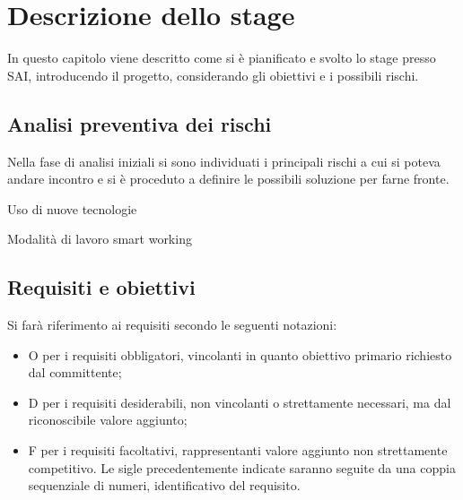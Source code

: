 
\chapter{Descrizione dello stage}
\label{cap:descrizione-stage}

In questo capitolo viene descritto come si è pianificato e svolto lo stage presso SAI, introducendo il progetto, considerando gli obiettivi e i possibili rischi.

\section{Analisi preventiva dei rischi}

Nella fase di analisi iniziali si sono individuati i principali rischi a cui si poteva andare incontro e si è proceduto a definire le possibili soluzione per farne fronte.\\

\begin{risk}{Uso di nuove tecnologie}
  \label{risk:new-tecnology}
\end{risk}
\begin{risk}{Modalità di lavoro smart working}
  \label{risk:smart-working}
\end{risk}

\section{Requisiti e obiettivi}

Si farà riferimento ai requisiti secondo le seguenti notazioni:
\begin{itemize}
  \item O per i requisiti obbligatori, vincolanti in quanto obiettivo primario richiesto dal committente;
  \item D per i requisiti desiderabili, non vincolanti o strettamente necessari, ma dal riconoscibile valore aggiunto;
  \item F per i requisiti facoltativi, rappresentanti valore aggiunto non strettamente competitivo.
        Le sigle precedentemente indicate saranno seguite da una coppia sequenziale di numeri, identificativo del requisito.
\end{itemize}

